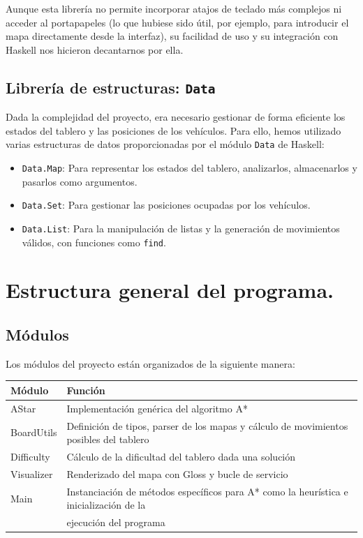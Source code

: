 \documentclass{article}
\begin{document}
Aunque esta librería no permite incorporar atajos de teclado más complejos ni acceder al portapapeles (lo que hubiese sido útil, por ejemplo, para introducir el mapa directamente desde la interfaz), su facilidad de uso y su integración con Haskell nos hicieron decantarnos por ella.

\subsection{Librería de estructuras: \texttt{Data}}

Dada la complejidad del proyecto, era necesario gestionar de forma eficiente los estados del tablero y las posiciones de los vehículos. Para ello, hemos utilizado varias estructuras de datos proporcionadas por el módulo \texttt{Data} de Haskell:

\begin{itemize}
  \item \texttt{Data.Map}: Para representar los estados del tablero, analizarlos, almacenarlos y pasarlos como argumentos.
  
  \item \texttt{Data.Set}: Para gestionar las posiciones ocupadas por los vehículos.
  
  \item \texttt{Data.List}: Para la manipulación de listas y la generación de movimientos válidos, con funciones como \texttt{find}.
\end{itemize}

\section{Estructura general del programa.}
\subsection{Módulos}
Los módulos del proyecto están organizados de la siguiente manera:

\begin{table}[h!]
\centering
\begin{tabular}{|l|l|}
\hline
\textbf{Módulo} & \textbf{Función} \\
\hline
AStar & Implementación genérica del algoritmo A*\\
BoardUtils & Definición de tipos, parser de los mapas y cálculo de movimientos posibles del tablero \\
Difficulty & Cálculo de la dificultad del tablero dada una solución\\
Visualizer & Renderizado del mapa con Gloss y bucle de servicio \\
Main & Instanciación de métodos específicos para A* como la heurística e inicialización de la \\
     & ejecución del programa\\
\hline
\end{tabular}
\end{table}
\end{document}
